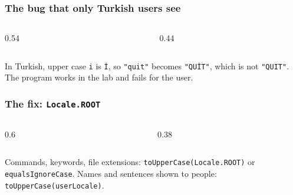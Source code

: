 \documentclass[aspectratio=169,10pt,compress]{beamer}
\begin{document}




\begin{frame}[t,fragile] \frametitle{The bug that only Turkish users see}
  \begin{columns}[T]
    \begin{column}{0.54\textwidth}
    \end{column}
    \begin{column}{0.44\textwidth}
    \end{column}
  \end{columns}
  \vspace{0.1em}
  \small In Turkish, upper case \texttt{i} is \texttt{İ}, so \texttt{"quit"} becomes \texttt{"QUİT"},
  which is not \texttt{"QUIT"}. The program works in the lab and fails for the user.
\end{frame}




\begin{frame}[t,fragile] \frametitle{The fix: \texttt{Locale.ROOT}}
  \begin{columns}[T]
    \begin{column}{0.6\textwidth}
    \end{column}
    \begin{column}{0.38\textwidth}
    \end{column}
  \end{columns}

  \vspace{0.1em}
  \small Commands, keywords, file extensions: \texttt{toUpperCase(Locale.ROOT)} or
  \texttt{equalsIgnoreCase}. Names and sentences shown to people: \texttt{toUpperCase(userLocale)}.
\end{frame}

\end{document}
